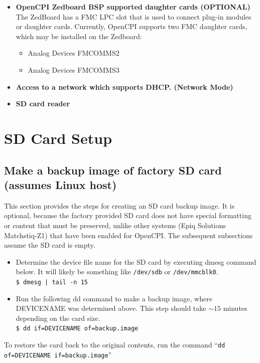\begin{flushleft}
\begin{itemize}
\item \textbf{OpenCPI Zedboard BSP supported daughter cards (OPTIONAL)}\\
The ZedBoard has a FMC LPC slot that is used to connect plug-in modules or daughter cards. Currently, OpenCPI supports two FMC daughter cards, which may be installed on the Zedboard:
\begin{itemize}
	\item Analog Devices FMCOMMS2
	\item Analog Devices FMCOMMS3
\end{itemize} \medskip

\item \textbf{Access to a network which supports DHCP. (Network Mode)}

\item \textbf{SD card reader}
\end{itemize}
\end{flushleft}

\pagebreak
\section{SD Card Setup}
\label{sec:SD_Card_Setup}
\subsection{Make a backup image of factory SD card (assumes Linux host)}
This section provides the steps for creating an SD card backup image. It is optional, because the factory provided SD card does not have special formatting or content that must be preserved, unlike other systems (Epiq Solutions Matchstiq-Z1) that have been enabled for OpenCPI. The subsequent subsections assume the SD card is empty.

\begin{itemize}
\item Determine the device file name for the SD card by executing dmesg command below. It will likely be something like \texttt{/dev/sdb} or \texttt{/dev/mmcblk0}.\\
\texttt{\$ dmesg | tail -n 15} \\
\item Run the following dd command to make a backup image, where DEVICENAME was determined above. This step should take $\sim15$ minutes depending on the card size.\\ \medskip
\texttt{\$ dd if=DEVICENAME of=backup.image}
\end{itemize}
\noindent To restore the card back to the original contents, run the command ``\texttt{dd of=DEVICENAME if=backup.image}''

